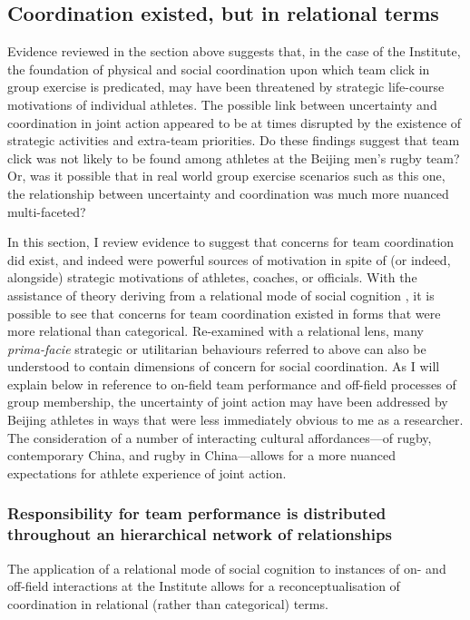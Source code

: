 \begin{CJK}{UTF8}{gbsn}
\subsection{Coordination existed, but in relational terms\label{}}
Evidence reviewed in the section above suggests that, in the case of the Institute, the foundation of physical and social coordination upon which team click in group exercise is predicated, may have been threatened by strategic life-course motivations of individual athletes.  The possible link between uncertainty and coordination in joint action appeared to be at times disrupted by the existence of strategic activities and extra-team priorities.  Do these findings suggest that team click was not likely to be found among athletes at the Beijing men's rugby team? Or, was it possible that in real world group exercise scenarios such as this one, the relationship between uncertainty and coordination was much more nuanced multi-faceted?

In this section, I review evidence to suggest that concerns for team coordination did exist, and indeed were powerful sources of motivation in spite of (or indeed, alongside) strategic motivations of athletes, coaches, or officials.  With the assistance of theory deriving from a relational mode of social cognition \citep{Liu2009}, it is possible to see that concerns for team coordination existed in forms that were more relational than categorical.  Re-examined with a relational lens, many \textit{prima-facie} strategic or utilitarian behaviours referred to above can also be understood to contain dimensions of concern for social coordination.  As I will explain below in reference to on-field team performance and off-field processes of group membership, the uncertainty of joint action may have been addressed by Beijing athletes in ways that were less immediately obvious to me as a researcher.  The consideration of a number of interacting cultural affordances---of rugby, contemporary China, and rugby in China---allows for a more nuanced expectations for athlete experience of joint action.


\subsubsection{Responsibility for team performance is distributed throughout an hierarchical network of relationships\label{sect:relationalPerformance}}
The application of a relational mode of social cognition to instances of on- and off-field interactions at the Institute allows for a reconceptualisation of coordination in relational (rather than categorical) terms.


\end{CJK}
